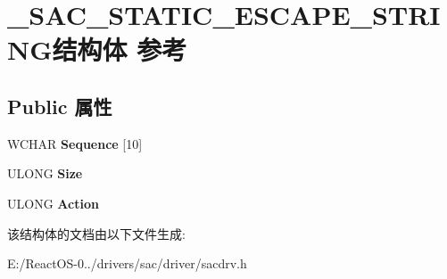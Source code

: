 \hypertarget{struct___s_a_c___s_t_a_t_i_c___e_s_c_a_p_e___s_t_r_i_n_g}{}\section{\+\_\+\+S\+A\+C\+\_\+\+S\+T\+A\+T\+I\+C\+\_\+\+E\+S\+C\+A\+P\+E\+\_\+\+S\+T\+R\+I\+N\+G结构体 参考}
\label{struct___s_a_c___s_t_a_t_i_c___e_s_c_a_p_e___s_t_r_i_n_g}
\subsection*{Public 属性}
\begin{DoxyCompactItemize}
\item 
\mbox{\label{struct___s_a_c___s_t_a_t_i_c___e_s_c_a_p_e___s_t_r_i_n_g_a48225eb250a08f74df52a1cae548f6be}} 
W\+C\+H\+AR {\bfseries Sequence} \mbox{[}10\mbox{]}
\item 
\mbox{\label{struct___s_a_c___s_t_a_t_i_c___e_s_c_a_p_e___s_t_r_i_n_g_a0801237fd6575108cc81758418c5336b}} 
U\+L\+O\+NG {\bfseries Size}
\item 
\mbox{\label{struct___s_a_c___s_t_a_t_i_c___e_s_c_a_p_e___s_t_r_i_n_g_a6b1b8f92a60927562861e63d4abea037}} 
U\+L\+O\+NG {\bfseries Action}
\end{DoxyCompactItemize}


该结构体的文档由以下文件生成\+:\begin{DoxyCompactItemize}
\item 
E\+:/\+React\+O\+S-\/0../drivers/sac/driver/sacdrv.\+h\end{DoxyCompactItemize}
